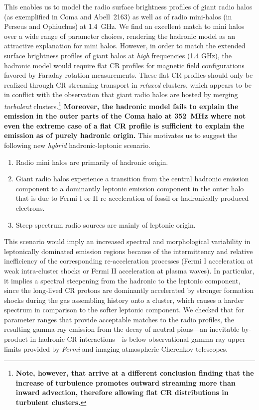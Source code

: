 \documentclass[useAMS,usenatbib]{mn2e}
\begin{document}
This enables us to model the radio surface brightness profiles of giant radio
halos (as exemplified in Coma and Abell~2163) as well as of radio mini-halos (in
Perseus and Ophiuchus) at 1.4~GHz. We find an excellent match to mini halos over
a wide range of parameter choices, rendering the hadronic model as an attractive
explanation for mini halos. However, in order to match the extended surface
brightness profiles of giant halos at {\em high} frequencies (1.4 GHz), the
hadronic model would require flat CR profiles for magnetic field configurations
favored by Faraday rotation measurements. These flat CR profiles should only be
realized through CR streaming transport in {\em relaxed} clusters, which appears
to be in conflict with the observation that giant radio halos are hosted by
merging {\em turbulent} clusters.\footnote{{\bf Note, however, that
    \cite{2013arXiv1303.4746W} arrive at a different conclusion finding that the
    increase of turbulence promotes outward streaming more than inward
    advection, therefore allowing flat CR distributions in turbulent clusters.}}
{\bf Moreover, the hadronic model fails to explain the emission in the outer
  parts of the Coma halo at 352~MHz where not even the extreme case of a flat CR
  profile is sufficient to explain the emission as of purely hadronic origin.}
This motivates us to suggest the following new \emph{hybrid} hadronic-leptonic
scenario.
\begin{enumerate}
\item Radio mini halos are primarily of hadronic origin.  
\item Giant radio halos experience a transition from the central hadronic
  emission component to a dominantly leptonic emission component in the outer
  halo that is due to Fermi I or II re-acceleration of fossil or hadronically
  produced electrons.
\item Steep spectrum radio sources are mainly of leptonic origin.
\end{enumerate}
This scenario would imply an increased spectral and morphological variability in
leptonically dominated emission regions because of the intermittency and
relative inefficiency of the corresponding re-acceleration processes (Fermi I
acceleration at weak intra-cluster shocks or Fermi II acceleration at plasma
waves). In particular, it implies a spectral steepening from the hadronic to the
leptonic component, since the long-lived CR protons are dominantly accelerated
by stronger formation shocks during the gas assembling history onto a cluster,
which causes a harder spectrum in comparison to the softer leptonic component.
We checked that for parameter ranges that provide acceptable matches to the
radio profiles, the resulting gamma-ray emission from the decay of neutral
pions---an inevitable by-product in hadronic CR interactions---is below
observational gamma-ray upper limits provided by {\em Fermi} and imaging
atmospheric Cherenkov telescopes.
\end{document}
